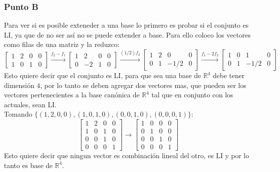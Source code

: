 \documentclass[a4paper,12pt]{article}
\begin{document}
\subsubsection{Punto B}
Para ver si es posible exteneder a una base lo primero es probar si el conjunto es LI, ya que de no ser así no se puede extender a base. Para ello coloco los vectores como filas de una matriz y la reduzco:
$$
\begin{bmatrix}
1 & 2 & 0 & 0\\ 
1 & 0 & 1 & 0
\end{bmatrix}
\xrightarrow[]{f_2-f_1}
\begin{bmatrix}
1 & 2 & 0 & 0\\ 
0 & -2 & 1 & 0
\end{bmatrix}
\xrightarrow[]{(1/2)f_2}
\begin{bmatrix}
1 & 2 & 0 & 0\\ 
0 & 1 & -1/2 & 0
\end{bmatrix}
\xrightarrow[]{f_1-2f_2}
\begin{bmatrix}
1 & 0 & 1 & 0\\ 
0 & 1 & -1/2 & 0
\end{bmatrix}
$$
Esto quiere decir que el conjunto es LI, para que sea una base de $\mathds{R}^4$ debe tener dimensión $4$, por lo tanto se deben agregar dos vectores mas, que pueden ser los vectores pertenecientes a la base canónica de $\mathds{R}^4$ tal que en conjunto con los actuales, sean LI. \\
Tomando $\{ (1, 2, 0, 0),(1, 0, 1, 0), (0,0,1,0), (0,0,0,1) \}$:
$$
\begin{bmatrix}
1 & 2 & 0 & 0\\ 
1 & 0 & 1 & 0\\ 
0 & 0 & 1 & 0\\ 
0 & 0 & 0 & 1
\end{bmatrix}
\xrightarrow[]{}
\begin{bmatrix}
1 & 0 & 0 & 0\\ 
0 & 1 & 0 & 0\\ 
0 & 0 & 1 & 0\\ 
0 & 0 & 0 & 1
\end{bmatrix}
$$
Esto quiere decir que ningun vector es combinación lineal del otro, es LI y por lo tanto es base de $\mathds{R}^4$.
\end{document}
